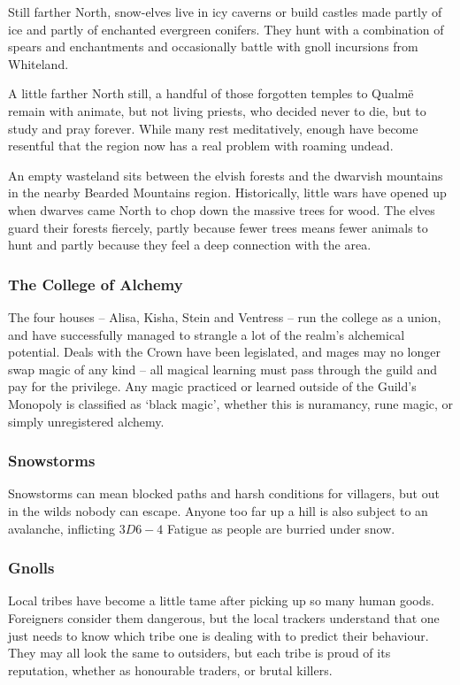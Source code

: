 \begin{multicols}{2}
Still farther North, snow-elves live in icy caverns or build castles made partly of ice and partly of enchanted evergreen conifers.
They hunt with a combination of spears and enchantments and occasionally battle with gnoll incursions from Whiteland.

A little farther North still, a handful of those forgotten temples to Qualm\"{e} remain with animate, but not living priests, who decided never to die, but to study and pray forever.
While many rest meditatively, enough have become resentful that the region now has a real problem with roaming undead.

An empty wasteland sits between the elvish forests and the dwarvish mountains in the nearby Bearded Mountains region.
Historically, little wars have opened up when dwarves came North to chop down the massive trees for wood.
The elves guard their forests fiercely, partly because fewer trees means fewer animals to hunt and partly because they feel a deep connection with the area.

\subsubsection{The College of Alchemy}

The four houses -- Alisa, Kisha, Stein and Ventress -- run the college as a union, and have successfully managed to strangle a lot of the realm's alchemical potential.
Deals with the Crown have been legislated, and mages may no longer swap magic of any kind -- all magical learning must pass through the guild and pay for the privilege.
Any magic practiced or learned outside of the Guild's Monopoly is classified as `black magic', whether this is nuramancy, rune magic, or simply unregistered alchemy.

\subsubsection{Snowstorms}

Snowstorms can mean blocked paths and harsh conditions for villagers, but out in the wilds nobody can escape.
Anyone too far up a hill is also subject to an avalanche, inflicting $3D6-4$ Fatigue as people are burried under snow.

\subsubsection{Gnolls}

Local tribes have become a little tame after picking up so many human goods.
Foreigners consider them dangerous, but the local trackers understand that one just needs to know which tribe one is dealing with to predict their behaviour.
They may all look the same to outsiders, but each tribe is proud of its reputation, whether as honourable traders, or brutal killers.


\end{multicols}
